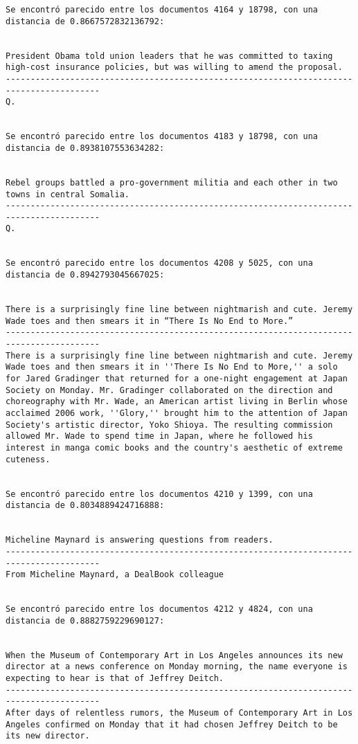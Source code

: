\documentclass[11pt]{article}
\begin{document}
\begin{Verbatim}[commandchars=\\\{\}]
Se encontró parecido entre los documentos 4164 y 18798, con una distancia de 0.8667572832136792:


President Obama told union leaders that he was committed to taxing high-cost insurance policies, but was willing to amend the proposal.
-----------------------------------------------------------------------------------------
Q.


Se encontró parecido entre los documentos 4183 y 18798, con una distancia de 0.8938107553634282:


Rebel groups battled a pro-government militia and each other in two towns in central Somalia.
-----------------------------------------------------------------------------------------
Q.


Se encontró parecido entre los documentos 4208 y 5025, con una distancia de 0.8942793045667025:


There is a surprisingly fine line between nightmarish and cute. Jeremy Wade toes and then smears it in “There Is No End to More.”
-----------------------------------------------------------------------------------------
There is a surprisingly fine line between nightmarish and cute. Jeremy Wade toes and then smears it in ''There Is No End to More,'' a solo for Jared Gradinger that returned for a one-night engagement at Japan Society on Monday. Mr. Gradinger collaborated on the direction and choreography with Mr. Wade, an American artist living in Berlin whose acclaimed 2006 work, ''Glory,'' brought him to the attention of Japan Society's artistic director, Yoko Shioya. The resulting commission allowed Mr. Wade to spend time in Japan, where he followed his interest in manga comic books and the country's aesthetic of extreme cuteness.


Se encontró parecido entre los documentos 4210 y 1399, con una distancia de 0.8034889424716888:


Micheline Maynard is answering questions from readers.
-----------------------------------------------------------------------------------------
From Micheline Maynard, a DealBook colleague


Se encontró parecido entre los documentos 4212 y 4824, con una distancia de 0.8882759229690127:


When the Museum of Contemporary Art in Los Angeles announces its new director at a news conference on Monday morning, the name everyone is expecting to hear is that of Jeffrey Deitch.
-----------------------------------------------------------------------------------------
After days of relentless rumors, the Museum of Contemporary Art in Los Angeles confirmed on Monday that it had chosen Jeffrey Deitch to be its new director.



\end{Verbatim}
\end{document}

